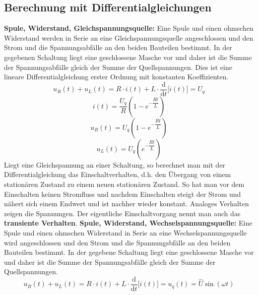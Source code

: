 \subsection{Berechnung mit Differentialgleichungen}
\textbf{Spule, Widerstand, Gleichspannungsquelle:} Eine Spule und einen ohmschen Widerstand werden in Serie an eine Gleichspannungsquelle angeschlossen und den Strom und die Spannungsabfälle an den beiden Bauteilen bestimmt. In der gegebenen Schaltung liegt eine geschlossene Masche vor und daher ist die Summe der Spannungsabfälle gleich der Summe der Quellspannungen. Dies ist eine lineare Differentialgleichung erster Ordnung mit konstanten Koeffizienten. 
\begin{equation}
\boxed{u_R\left(t\right)+u_L\left(t\right)=R\cdot i\left(t\right)+L\cdot \dfrac{\text{d}}{\text{d}t}\Big[i\left(t\right)\Big]=U_q}
\end{equation}
\begin{equation}
\boxed{i\left(t\right)=\dfrac{U_q}{R}\left(1-e^{-\dfrac{Rt}{L}}\right)}
\end{equation}
\begin{equation}
\boxed{u_R\left(t\right)=U_q\left(1-e^{-\dfrac{Rt}{L}}\right)}
\end{equation}
\begin{equation}
\boxed{u_L\left(t\right)=U_q\left(e^{-\dfrac{Rt}{L}}\right)}
\end{equation}
Liegt eine Gleichspannung an einer Schaltung, so berechnet man mit der Differentialgleichung das Einschaltverhalten, d.h. den Übergang von einem stationären Zustand zu einem neuen stationären Zustand. So hat man vor dem Einschalten keinen Stromfluss und nachdem Einschalten steigt der Strom und nähert sich einem Endwert und ist nachher wieder konstant. Analoges Verhalten zeigen die Spannungen. Der eigentliche Einschaltvorgang nennt man auch das \textbf{transiente Verhalten}.
\newline\newline
\textbf{Spule, Widerstand, Wechselspannungsquelle:} Eine Spule und einen ohmschen Widerstand in Serie an eine Wechselspannungsquelle wird angeschlossen und den Strom und die Spannungsbfälle an den beiden Bauteilen bestimmt. In der gegebene Schaltung liegt eine geschlossene Masche vor und daher ist die Summe der Spannungsabfälle gleich der Summe der Quellspannungen.
\begin{equation}
\boxed{u_R\left(t\right)+u_L\left(t\right)=R\cdot i\left(t\right)+L\cdot \dfrac{\text{d}}{\text{d}t}\Big[i\left(t\right)\Big]=u_q\left(t\right)=\hat{U}\sin\left(\omega t\right)}
\end{equation}
